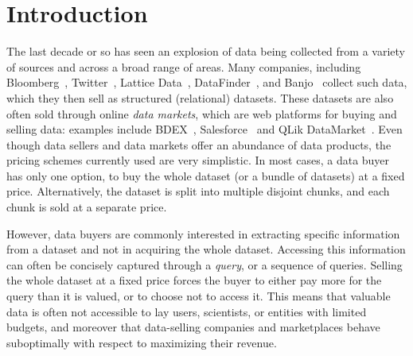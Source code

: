 \section{Introduction}
\label{sec:intro}

The last decade or so has seen an explosion of data being collected from a variety of sources and across a broad range of areas. Many companies, including Bloomberg~\cite{bloomberg}, Twitter~\cite{twitterapi}, Lattice Data~\cite{lattice}, DataFinder~\cite{datafinder}, and Banjo~\cite{banjo} collect such data, which they then sell as structured (relational) datasets. 
These datasets are also often sold through online {\em data markets}, which are web platforms for buying and selling data: examples include BDEX~\cite{bdex}, Salesforce~\cite{salesforce} and QLik DataMarket~\cite{qlik}. Even though data sellers and data markets offer an abundance of data products, the pricing schemes currently used are very simplistic. In most cases, a data buyer has only one option, to buy the whole dataset (or a bundle of datasets) at a fixed price. Alternatively, the dataset is split into multiple disjoint chunks, and each chunk is sold at a separate price. 

However, data buyers are commonly interested in extracting specific information from a dataset and not in acquiring the whole dataset. Accessing this information can often be concisely captured through a {\em query}, or a sequence of queries. Selling the whole dataset at a fixed price forces the buyer to either pay more for the query than it is valued, or to choose not to access it. This means that valuable data is often not accessible to lay users, scientists, or entities with limited budgets, and moreover that data-selling companies and marketplaces behave suboptimally with respect to maximizing their revenue.

